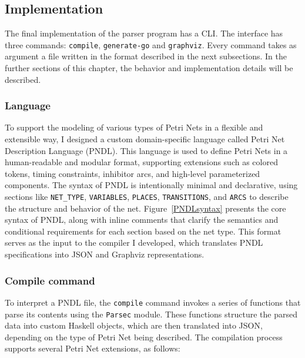 \documentclass[12pt]{article}
\begin{document}
    \subsection{Implementation}
        The final implementation of the parser program has a CLI. The interface has three commands: \texttt{compile}, \texttt{generate-go} and \texttt{graphviz}. Every command takes as argument a file written in the format described in the next subsections. In the further sections of this chapter, the behavior and implementation details will be described.
        \subsubsection{Language}
            To support the modeling of various types of Petri Nets in a flexible and extensible way, I designed a custom domain-specific language called Petri Net Description Language (PNDL). This language is used to define Petri Nets in a human-readable and modular format, supporting extensions such as colored tokens, timing constraints, inhibitor arcs, and high-level parameterized components. The syntax of PNDL is intentionally minimal and declarative, using sections like \texttt{NET\_TYPE}, \texttt{VARIABLES}, \texttt{PLACES}, \texttt{TRANSITIONS}, and \texttt{ARCS} to describe the structure and behavior of the net. 
            Figure~\ref{PNDLsyntax} presents the core syntax of PNDL, along with inline comments that clarify the semantics and conditional requirements for each section based on the net type. This format serves as the input to the compiler I developed, which translates PNDL specifications into JSON and Graphviz representations.      
        \subsubsection{Compile command}
        To interpret a PNDL file, the \texttt{compile} command invokes a series of functions that parse its contents using the \texttt{Parsec} module. These functions structure the parsed data into custom Haskell objects, which are then translated into JSON, depending on the type of Petri Net being described. The compilation process supports several Petri Net extensions, as follows:
\end{document}

